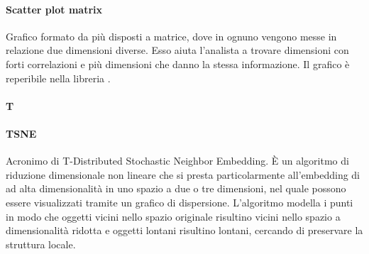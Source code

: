 \paragraph*{Scatter plot matrix}
Grafico formato da più  disposti a matrice, dove in ognuno vengono messe in relazione due dimensioni diverse. Esso aiuta l'analista a trovare dimensioni con forti correlazioni e più  dimensioni che danno la stessa informazione. Il grafico è reperibile nella libreria .

\paragraph*{T}

\paragraph*{TSNE}
Acronimo di T-Distributed Stochastic Neighbor Embedding. È un algoritmo di riduzione dimensionale non lineare che si presta particolarmente all'embedding di  ad alta dimensionalità in uno spazio a due o tre dimensioni, nel quale possono essere visualizzati tramite un grafico di dispersione. L'algoritmo modella i punti in modo che oggetti vicini nello spazio originale risultino vicini nello spazio a dimensionalità ridotta e oggetti lontani risultino lontani, cercando di preservare la struttura locale.
